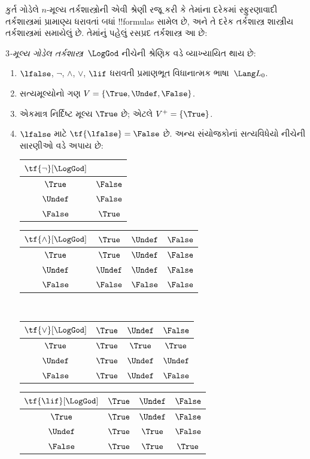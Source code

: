 \documentclass[../../../include/open-logic-section]{subfiles}
\begin{document}


કુર્ત ગોડેલે $n$-મૂલ્ય તર્કશાસ્ત્રોની એવી શ્રેણી રજૂ કરી કે
તેમાંના દરેકમાં સ્ફુરણાવાદી તર્કશાસ્ત્રમાં પ્રામાણ્ય ધરાવતાં બધાં
!!{formula}s સામેલ છે, અને તે દરેક તર્કશાસ્ત્ર શાસ્ત્રીય
તર્કશાસ્ત્રમાં સમાયેલું છે.
તેમાંનું પહેલું રસપ્રદ તર્કશાસ્ત્ર આ છે:

\begin{defn}
\emph{$3$-મૂલ્ય ગોડેલ તર્કશાસ્ત્ર}~$\LogGod$ નીચેની શ્રેણિક વડે
વ્યાખ્યાયિત થાય છે:
\begin{enumerate}
  \item $\lfalse$, $\lnot$, $\land$, $\lor$, $\lif$
  ધરાવતી પ્રમાણભૂત વિધાનાત્મક ભાષા~$\Lang L_0$.
  \item સત્યમૂલ્યોનો ગણ $V = \{\True, \Undef, \False\}$.
  \item એકમાત્ર નિર્દિષ્ટ મૂલ્ય $\True$ છે; એટલે $V^+ = \{\True\}$.
  \item $\lfalse$ માટે $\tf{\lfalse} = \False$ છે. અન્ય
  સંયોજકોનાં સત્યવિધેયો નીચેની સારણીઓ વડે અપાય છે:
  \begin{center}
    \begin{tabular}{c|c}
      $\tf{\lnot}[\LogGod]$ & \\
      \hline
      $\True$ & $\False$ \\
      $\Undef$ & $\False$ \\
      $\False$ & $\True$
    \end{tabular}
    \quad
    \begin{tabular}{c|ccc}
      $\tf{\land}[\LogGod]$ & $\True$ & $\Undef$ & $\False$ \\
      \hline
      $\True$ & $\True$ & $\Undef$ & $\False$ \\
      $\Undef$ & $\Undef$ & $\Undef$ & $\False$\\
      $\False$ & $\False$ & $\False$ & $\False$
    \end{tabular}
    \\[2ex]
    \begin{tabular}{c|ccc}
      $\tf{\lor}[\LogGod]$ & $\True$ & $\Undef$ & $\False$ \\
      \hline
      $\True$ & $\True$ & $\True$ & $\True$ \\
      $\Undef$ & $\True$ & $\Undef$ & $\Undef$ \\
      $\False$ & $\True$ & $\Undef$ & $\False$
    \end{tabular}
    \quad
    \begin{tabular}{c|ccc}
      $\tf{\lif}[\LogGod]$ & $\True$ & $\Undef$ & $\False$ \\
      \hline
      $\True$ & $\True$ & $\Undef$ & $\False$ \\
      $\Undef$ & $\True$ & $\True$ & $\False$ \\
      $\False$ & $\True$ & $\True$ & $\True$
    \end{tabular}
  \end{center}
\end{enumerate}
\end{defn}
\end{document}
